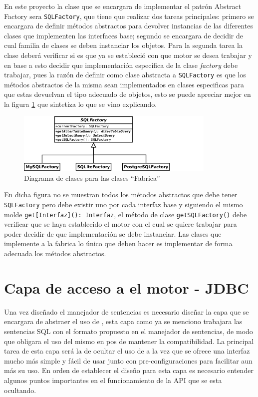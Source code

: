 En este proyecto la clase que se encargara de implementar el patrón Abstract Factory sera \verb=SQLFactory=, que tiene que realizar dos tareas principales: primero se encargara de definir métodos abstractos para devolver instancias de las diferentes clases que implementen las interfaces base; segundo se encargara de decidir de cual familia de clases se deben instanciar los objetos. Para la segunda tarea la clase deberá verificar si es que ya se estableció con que motor se desea trabajar y en base a esto decidir que implementación especifica de la clase \textit{factory} debe trabajar, pues la razón de definir como clase abstracta a \verb=SQLFactory= es que los métodos abstractos de la misma sean implementados en clases especificas para que estas devuelvan el tipo adecuado de objetos, esto se puede apreciar mejor en la figura \ref{fig:crossdb-factory} que sintetiza lo que se vino explicando. 
%
\begin{figure}[h]
  \centering
    \includegraphics[width=0.85\textwidth]{figuras/crossdb-factory.png}
  \caption{Diagrama de clases para las clases ``Fabrica''}
  \label{fig:crossdb-factory}
\end{figure}

En dicha figura no se muestran todos los métodos abstractos que debe tener \verb=SQLFactory= pero debe existir uno por cada interfaz base y siguiendo el mismo molde \verb=get[Interfaz](): Interfaz=, el método de clase \verb=getSQLFactory()= debe verificar que se haya establecido el motor con el cual se quiere trabajar para poder decidir de que implementación se debe instanciar. Las clases que implemente a la fabrica lo único que deben hacer es implementar de forma adecuada los métodos abstractos.  
%
\section{Capa de acceso a el motor - JDBC}
Una vez diseñado el manejador de sentencias es necesario diseñar la capa que se encargara de abstraer el uso de \jd, esta capa como ya se menciono trabajara las sentencias SQL con el formato propuesto en el manejador de sentencias, de modo que obligara el uso del mismo en pos de mantener la compatibilidad. La principal tarea de esta capa será la de ocultar el uso de \jd  a la vez que se ofrece una interfaz mucho más simple y fácil de usar junto con pre-configuraciones para facilitar aun más su uso. En orden de establecer el diseño para esta capa es necesario entender algunos puntos importantes en el funcionamiento de la API que se esta ocultando.
%

